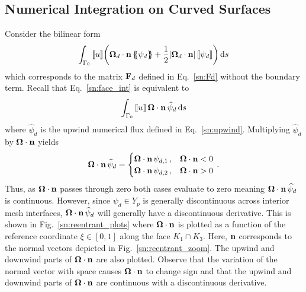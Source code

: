 \documentclass[../doc.tex]{subfiles}
\begin{document}
\subsection{Numerical Integration on Curved Surfaces}
Consider the bilinear form 
	\begin{equation} \label{sn:face_int}
		\int_{\Gamma_0} \left\llbracket u \right\rrbracket\!\left( \boldsymbol{\Omega}_d\cdot\boldsymbol{\mathrm{n}}\left\{\!\!\left\{\psi_d\right\}\!\!\right\} + \frac{1}{2}|\boldsymbol{\Omega}_d\cdot\boldsymbol{\mathrm{n}}|\left\llbracket\psi_d \right\rrbracket \right) \mathop{}\!\mathrm{d} s
	\end{equation}
which corresponds to the matrix $\boldsymbol{\mathrm{F}}_d$ defined in Eq.~\ref{sn:Fd} without the boundary term. Recall that Eq.~\ref{sn:face_int} is equivalent to 
	\begin{equation}
		\int_{\Gamma_0} \left\llbracket u \right\rrbracket\boldsymbol{\Omega}\cdot\boldsymbol{\mathrm{n}}\,\widehat{\psi}_d \mathop{}\!\mathrm{d} s 
	\end{equation}
where $\widehat{\psi}_d$ is the upwind numerical flux defined in Eq.~\ref{sn:upwind}. Multiplying $\widehat{\psi}_d$ by $\boldsymbol{\Omega}\cdot\boldsymbol{\mathrm{n}}$ yields 
	\begin{equation}
		\boldsymbol{\Omega}\cdot\boldsymbol{\mathrm{n}}\,\widehat{\psi}_d = \begin{cases}
			\boldsymbol{\Omega}\cdot\boldsymbol{\mathrm{n}}\,\psi_{d,1} \,, & \boldsymbol{\Omega}\cdot\boldsymbol{\mathrm{n}}<0 \\ 
			\boldsymbol{\Omega}\cdot\boldsymbol{\mathrm{n}}\,\psi_{d,2} \,, & \boldsymbol{\Omega}\cdot\boldsymbol{\mathrm{n}}>0 
		\end{cases} \,. 
	\end{equation}
Thus, as $\boldsymbol{\Omega}\cdot\boldsymbol{\mathrm{n}}$ passes through zero both cases evaluate to zero meaning $\boldsymbol{\Omega}\cdot\boldsymbol{\mathrm{n}}\,\widehat{\psi}_d$ is continuous. However, since $\psi_d \in Y_p$ is generally discontinuous across interior mesh interfaces, $\boldsymbol{\Omega}\cdot\boldsymbol{\mathrm{n}}\,\widehat{\psi}_d$ will generally have a discontinuous derivative. This is shown in Fig.~\ref{sn:reentrant_plots} where $\boldsymbol{\Omega}\cdot\boldsymbol{\mathrm{n}}$ is plotted as a function of the reference coordinate $\xi\in[0,1]$ along the face $K_1 \cap K_3$. Here, $\boldsymbol{\mathrm{n}}$ corresponds to the normal vectors depicted in Fig.~\ref{sn:reentrant_zoom}. The upwind and downwind parts of $\boldsymbol{\Omega}\cdot\boldsymbol{\mathrm{n}}$ are also plotted. Observe that the variation of the normal vector with space causes $\boldsymbol{\Omega}\cdot\boldsymbol{\mathrm{n}}$ to change sign and that the upwind and downwind parts of $\boldsymbol{\Omega}\cdot\boldsymbol{\mathrm{n}}$ are continuous with a discontinuous derivative. 
\end{document}

